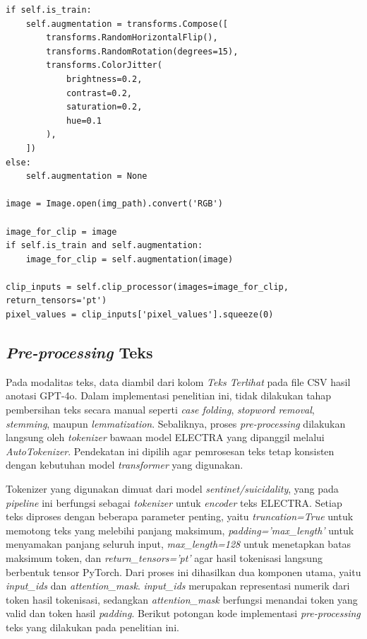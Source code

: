 \begin{lstlisting}[caption={Kode \textit{Pre-processing} Gambar}, label={code:4.preprocessing_gambar}]
if self.is_train:
    self.augmentation = transforms.Compose([
        transforms.RandomHorizontalFlip(),
        transforms.RandomRotation(degrees=15),
        transforms.ColorJitter(
            brightness=0.2,
            contrast=0.2,
            saturation=0.2,
            hue=0.1
        ),
    ])
else:
    self.augmentation = None

image = Image.open(img_path).convert('RGB')

image_for_clip = image
if self.is_train and self.augmentation:
    image_for_clip = self.augmentation(image)

clip_inputs = self.clip_processor(images=image_for_clip, return_tensors='pt')
pixel_values = clip_inputs['pixel_values'].squeeze(0)
\end{lstlisting}


\subsection{\textit{Pre-processing} Teks} \label{IV.Preprocessing.Teks}

Pada modalitas teks, data diambil dari kolom \textit{Teks Terlihat} pada file CSV hasil anotasi GPT-4o. Dalam implementasi penelitian ini, tidak dilakukan tahap pembersihan teks secara manual seperti \textit{case folding}, \textit{stopword removal}, \textit{stemming}, maupun \textit{lemmatization}. Sebaliknya, proses \textit{pre-processing} dilakukan langsung oleh \textit{tokenizer} bawaan model ELECTRA yang dipanggil melalui \textit{AutoTokenizer}. Pendekatan ini dipilih agar pemrosesan teks tetap konsisten dengan kebutuhan model \textit{transformer} yang digunakan.

Tokenizer yang digunakan dimuat dari model \textit{sentinet/suicidality}, yang pada \textit{pipeline} ini berfungsi sebagai \textit{tokenizer} untuk \textit{encoder} teks ELECTRA. Setiap teks diproses dengan beberapa parameter penting, yaitu \textit{truncation=True} untuk memotong teks yang melebihi panjang maksimum, \textit{padding='max\_length'} untuk menyamakan panjang seluruh input, \textit{max\_length=128} untuk menetapkan batas maksimum token, dan \textit{return\_tensors='pt'} agar hasil tokenisasi langsung berbentuk tensor PyTorch. Dari proses ini dihasilkan dua komponen utama, yaitu \textit{input\_ids} dan \textit{attention\_mask}. \textit{input\_ids} merupakan representasi numerik dari token hasil tokenisasi, sedangkan \textit{attention\_mask} berfungsi menandai token yang valid dan token hasil \textit{padding}. Berikut potongan kode implementasi \textit{pre-processing} teks yang dilakukan pada penelitian ini.

